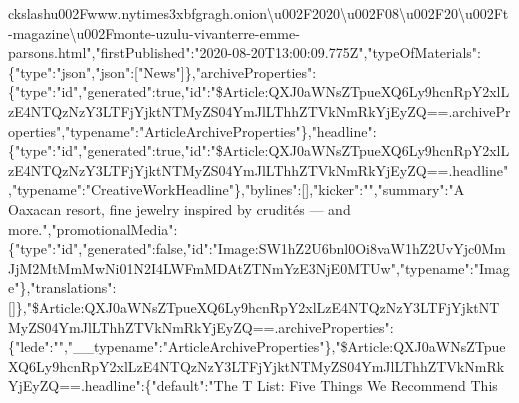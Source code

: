 ckslash{}u002Fwww.nytimes3xbfgragh.onion\textbackslash{}u002F2020\textbackslash{}u002F08\textbackslash{}u002F20\textbackslash{}u002Ft-magazine\textbackslash{}u002Fmonte-uzulu-vivanterre-emme-parsons.html","firstPublished":"2020-08-20T13:00:09.775Z","typeOfMaterials":\{"type":"json","json":{[}"News"{]}\},"archiveProperties":\{"type":"id","generated":true,"id":"\$Article:QXJ0aWNsZTpueXQ6Ly9hcnRpY2xlLzE4NTQzNzY3LTFjYjktNTMyZS04YmJlLThhZTVkNmRkYjEyZQ==.archiveProperties","typename":"ArticleArchiveProperties"\},"headline":\{"type":"id","generated":true,"id":"\$Article:QXJ0aWNsZTpueXQ6Ly9hcnRpY2xlLzE4NTQzNzY3LTFjYjktNTMyZS04YmJlLThhZTVkNmRkYjEyZQ==.headline","typename":"CreativeWorkHeadline"\},"bylines":{[}{]},"kicker":"","summary":"A
Oaxacan resort, fine jewelry inspired by crudités --- and
more.","promotionalMedia":\{"type":"id","generated":false,"id":"Image:SW1hZ2U6bnl0Oi8vaW1hZ2UvYjc0MmJjM2MtMmMwNi01N2I4LWFmMDAtZTNmYzE3NjE0MTUw","typename":"Image"\},"translations":{[}{]}\},"\$Article:QXJ0aWNsZTpueXQ6Ly9hcnRpY2xlLzE4NTQzNzY3LTFjYjktNTMyZS04YmJlLThhZTVkNmRkYjEyZQ==.archiveProperties":\{"lede":"","\_\_typename":"ArticleArchiveProperties"\},"\$Article:QXJ0aWNsZTpueXQ6Ly9hcnRpY2xlLzE4NTQzNzY3LTFjYjktNTMyZS04YmJlLThhZTVkNmRkYjEyZQ==.headline":\{"default":"The
T List: Five Things We Recommend This
